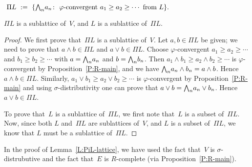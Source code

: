 \documentclass[main.tex]{subfiles}
\begin{document}
\begin{dfn}
\label{D:PiL}
$\ \Pi L \ \eqdf \ \{ 
\bw_n a_n \colon \ \text{$\varphi$-convergent }
 a_1\geq a_2 \geq\dotsb \text{ from $L$} \}.$
\end{dfn}
%
%
\begin{lem}
\label{L:PiL-lattice}
$\Pi L$ is a sublattice of~$V$,
and $L$ is a sublattice of~$\Pi L$.
\end{lem}
\begin{proof}
We first prove that~$\Pi L$ is a sublattice of~$V$.
Let $a,b\in \Pi L$ be given;
we need to prove that $a\wedge b \in \Pi L$
and $a \vee b \in \Pi L$.
Choose $\varphi$-convergent 
$a_1 \geq a_2 \geq\dotsb$ and
$b_1 \geq b_2 \geq\dotsb$
with $a = \textstyle{\bigwedge}_n a_n$ and  $b=\textstyle{\bigwedge}_n b_n$.
Then $a_1 \wedge b_1 \geq a_2 \wedge b_2 \geq \dotsb$
is $\varphi$-convergent by Proposition~\ref{P:R-main},
and we have $\textstyle{\bigwedge}_n a_n \wedge b_n = a\wedge b$.
Hence $a\wedge b \in \Pi L$.
Similarly,
$a_1 \vee b_1 \geq a_2 \vee b_2 \geq \dotsb$
is $\varphi$-convergent by Proposition~\ref{P:R-main}
and
using $\sigma$-distributivity 
one can prove that $a \vee b  =\textstyle{\bigwedge}_n a_n \vee b_n$.
Hence $a\vee b \in \Pi L$.

To prove that~$L$ is a sublattice of~$\Pi L$,
we first note that~$L$ is a subset of~$\Pi L$.
Now,
since both $L$ and~$\Pi L$ are sublattices of~$V$,
and $L$ is a subset of~$\Pi L$,
we know that $L$ must be a sublattice of~$\Pi L$.
\end{proof}
\begin{rem}
In the proof of Lemma~\ref{L:PiL-lattice},
we have used the fact that~$V$ is $\sigma$-distrubutive
and the fact that~$E$ is $R$-complete
(via Proposition~\ref{P:R-main}).
\end{rem}
\end{document}

